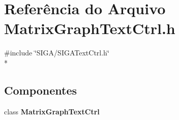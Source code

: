 \section{Referência do Arquivo Matrix\+Graph\+Text\+Ctrl.\+h}
\label{_matrix_graph_text_ctrl_8h}
{\ttfamily \#include \char`\"{}S\+I\+G\+A/\+S\+I\+G\+A\+Text\+Ctrl.\+h\char`\"{}}\\*
\subsection*{Componentes}
\begin{DoxyCompactItemize}
\item 
class {\bf Matrix\+Graph\+Text\+Ctrl}
\end{DoxyCompactItemize}
